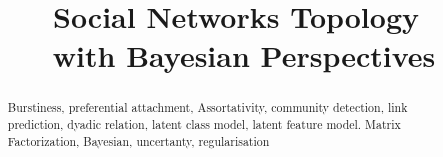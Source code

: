 \documentclass[journal]{IEEEtran}
\title{Social Networks Topology\\ with Bayesian Perspectives}
\begin{document}
	
\maketitle
\begin{abstract}
Burstiness, preferential attachment, Assortativity, community detection, link prediction, dyadic relation, latent class model, latent feature model. Matrix Factorization, Bayesian, uncertanty, regularisation
\end{abstract}

\IEEEpeerreviewmaketitle















\end{document}
